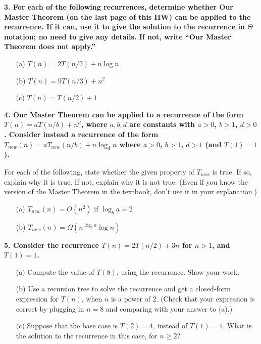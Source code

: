\documentclass{article}
\begin{document}
\vspace{1cm}

\noindent \textbf{3. For each of the following recurrences, determine whether Our Master Theorem (on the last page of this HW) can be applied to the recurrence. If it can, use it to give the solution to the recurrence in $\Theta$ notation; no need to give any details. If not, write “Our Master Theorem does not apply.”}

\begin{enumerate}
    \item[(a)] $T(n) = 2T(n/2) + n \log n$
    \item[(b)] $T(n) = 9T(n/3) + n^2$
    \item[(c)] $T(n) = T(n/2) + 1$
\end{enumerate}

\vspace{1cm}

\noindent \textbf{4. Our Master Theorem can be applied to a recurrence of the form $T(n) = aT(n/b) + n^d$, where $a, b, d$ are constants with $a > 0$, $b > 1$, $d > 0$. Consider instead a recurrence of the form $T_{new}(n) = aT_{new}(n/b) + n \log_d n$ where $a > 0$, $b > 1$, $d > 1$ (and $T(1) = 1$).}

For each of the following, state whether the given property of $T_{new}$ is true. If so, explain why it is true. If not, explain why it is not true. (Even if you know the version of the Master Theorem in the textbook, don’t use it in your explanation.)

\begin{enumerate}
    \item[(a)] $T_{new}(n) = O(n^2)$ if $\log_b a = 2$
    \item[(b)] $T_{new}(n) = \Omega(n^{\log_b a} \log n)$
\end{enumerate}

\vspace{1cm}

\noindent \textbf{5. Consider the recurrence $T(n) = 2T(n/2) + 3n$ for $n > 1$, and $T(1) = 1$.}

\begin{enumerate}
    \item[(a)] Compute the value of $T(8)$, using the recurrence. Show your work.
    \item[(b)] Use a recursion tree to solve the recurrence and get a closed-form expression for $T(n)$, when $n$ is a power of 2. (Check that your expression is correct by plugging in $n = 8$ and comparing with your answer to (a).)
    \item[(c)] Suppose that the base case is $T(2) = 4$, instead of $T(1) = 1$. What is the solution to the recurrence in this case, for $n \ge 2$?
\end{enumerate}
\end{document}
